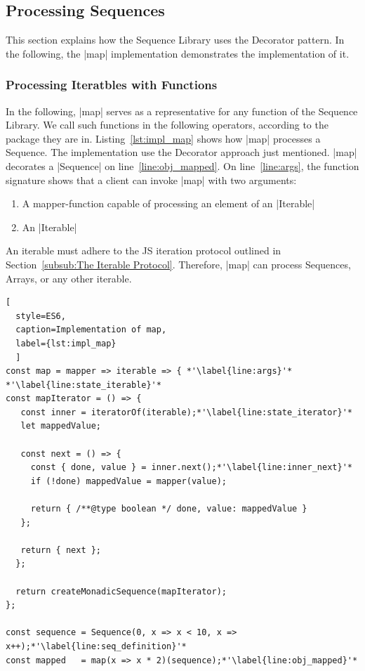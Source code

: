 \subsection{Processing Sequences}
\label{sec:Processing Sequences}
This section explains how the Sequence Library uses the Decorator pattern.
In the following, the |map| implementation demonstrates the implementation of it. 

\subsubsection{Processing Iteratbles with Functions}
\label{subsub:Processing Iterables with Functions}
In the following, |map| serves as a representative for any function of the
Sequence Library. We call such functions in the following operators,
according to the package they are in.
Listing~\ref{lst:impl_map} shows how |map| processes a Sequence. The
implementation use the Decorator approach just mentioned. |map| decorates a
|Sequence| on line~\ref{line:obj_mapped}.
\newline
On line~\ref{line:args}, the function signature shows that a client can invoke 
|map| with two arguments:

\begin{enumerate}
  \item{A mapper-function capable of processing an element of an |Iterable|}
  \item{An |Iterable|}
\end{enumerate}

An iterable must adhere to the JS iteration protocol 
outlined in Section~\ref{subsub:The Iterable Protocol}. Therefore, |map| can 
process Sequences, Arrays, or any other iterable. 

\begin{lstlisting}[
  style=ES6, 
  caption=Implementation of map,
  label={lst:impl_map}
  ]
const map = mapper => iterable => { *'\label{line:args}'*
*'\label{line:state_iterable}'*
const mapIterator = () => {
   const inner = iteratorOf(iterable);*'\label{line:state_iterator}'*
   let mappedValue;
 
   const next = () => {
     const { done, value } = inner.next();*'\label{line:inner_next}'*
     if (!done) mappedValue = mapper(value);
 
     return { /**@type boolean */ done, value: mappedValue }
   };
 
   return { next };
  };
 
  return createMonadicSequence(mapIterator);
};

const sequence = Sequence(0, x => x < 10, x => x++);*'\label{line:seq_definition}'*
const mapped   = map(x => x * 2)(sequence);*'\label{line:obj_mapped}'*
\end{lstlisting}

